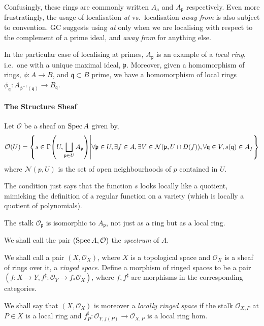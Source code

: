 \documentclass[000-main.tex]{subfiles}
\begin{document}
Confusingly, these rings are commonly written $A_a$ and $A_{\mathfrak{p}}$ respectively.
Even more frustratingly, the usage of localisation \emph{at} vs.\ localisation \emph{away from} is also subject to convention.
GC suggests using \emph{at} only when we are localising with respect to the complement of a prime ideal, and \emph{away from} for anything else.

In the particular case of localising at primes, $A_\mathfrak{p}$ is an example of a \emph{local ring}, i.e.\ one with a unique maximal ideal, $\mathfrak{p}$.
Moreover, given a homomorphism of rings, $\phi : A \to B$, and $\mathfrak{q}\subset B$ prime, we have a homomorphism of local rings $\phi_{\mathfrak{q}} : A_{\phi^{-1}(\mathfrak{q})} \to B_{\mathfrak{q}}$.

\paragraph{The Structure Sheaf}

\begin{definition}
  Let $\mathcal{O}$ be a sheaf on $\operatorname{Spec} A$ given by,
  \[
    \mathcal{O}(U) = \qty{
      s \in \Gamma\qty(U, \bigsqcup_{\mathfrak{p} \in U} A_{\mathfrak{p}})
      \middle\vert
      \forall \mathfrak{p}\in U,
      \exists f \in A,
      \exists V\in \mathcal{N}(\mathfrak{p}, U\cap D(f)),
      \forall \mathfrak{q} \in V, s(\mathfrak{q}) \in A_f
    }
  \]
  where $\mathcal{N}(p, U)$ is the set of open neighbourhoods of $p$ contained in $U$.
\end{definition}
The condition just says that the function $s$ looks locally like a quotient, mimicking the definition of a regular function on a variety (which is locally a quotient of polynomials).

\begin{lemma}
  The stalk $\mathcal{O}_{\mathfrak{p}}$ is isomorphic to $A_{\mathfrak{p}}$, not just as a ring but as a local ring.
\end{lemma}

We shall call the pair $(\operatorname{Spec} A, \mathcal{O})$ the \emph{spectrum} of $A$. 

\begin{definition}
  We shall call a pair $(X, \mathcal{O}_X)$, where $X$ is a topological space and $\mathcal{O}_X$ is a sheaf of rings over it, a \emph{ringed space}.
  Define a morphism of ringed spaces to be a pair $(f : X \to Y, f^\sharp : \mathcal{O}_Y \to f_\ast \mathcal{O}_X)$, where $f, f^\sharp$ are morphisms in the corresponding categories.

  We shall say that $(X, \mathcal{O}_X)$ is moreover a \emph{locally ringed space} if the stalk $\mathcal{O}_{X, P}$ at $P \in X$ is a local ring and $f^\sharp_P : \mathcal{O}_{Y, f(P)} \to \mathcal{O}_{X, P}$ is a local ring hom.
\end{definition}
\end{document}
